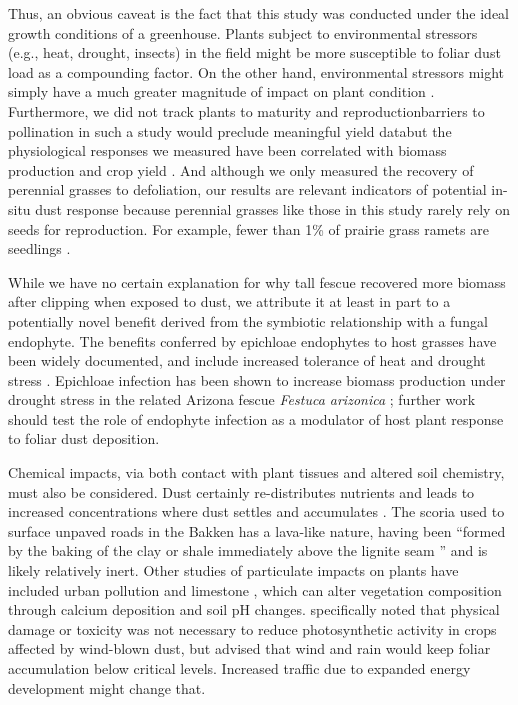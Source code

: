 \documentclass{svjour3}
\begin{document}
Thus, an obvious caveat is the fact that this study was conducted under the ideal growth conditions of a greenhouse. 
Plants subject to environmental stressors (e.g., heat, drought, insects) in the field might be more susceptible to foliar dust load as a compounding factor. 
On the other hand, environmental stressors might simply have a much greater magnitude of impact on plant condition \citep{matsuki2016}. 
Furthermore, we did not track plants to maturity and reproduction\textemdash barriers to pollination in such a study would preclude meaningful yield data\textemdash but the physiological responses we measured have been correlated with biomass production and crop yield \citep[e.g.,][]{fischer1998, zia-khan2014}. 
And although we only measured the recovery of perennial grasses to defoliation, our results are relevant indicators of potential in-situ dust response because perennial grasses like those in this study rarely rely on seeds for reproduction. 
For example, fewer than 1\% of prairie grass ramets are seedlings \citep{benson2006}. 
 
While we have no certain explanation for why tall fescue recovered more biomass after clipping when exposed to dust, we attribute it at least in part to a potentially novel benefit derived from the symbiotic relationship with a fungal endophyte. 
The benefits conferred by epichloae endophytes to host grasses have been widely documented, and include increased tolerance of heat and drought stress \cite{gibert2012,he2013}. 
Epichloae infection has been shown to increase biomass production under drought stress in the related Arizona fescue \emph{Festuca arizonica} \citep{morse2002}; further work should test the role of endophyte infection as a modulator of host plant response to foliar dust deposition. 

Chemical impacts, via both contact with plant tissues and altered soil chemistry, must also be considered. 
Dust certainly re-distributes nutrients and leads to increased concentrations where dust settles and accumulates \citep{brahney2014, lawrence2010}. 
The scoria used to surface unpaved roads in the Bakken has a lava-like nature, having been ``formed by the baking of the clay or shale immediately above the lignite seam \citep[][p.435]{roe1950}'' and is likely relatively inert. 
Other studies of particulate impacts on plants have included urban pollution \citep{bao2015} and limestone \citep{brown2009, organiscak2004}, which can alter vegetation composition through calcium deposition and soil pH changes. 
\citet{armbrust1986} specifically noted that physical damage or toxicity was not necessary to reduce photosynthetic activity in crops affected by wind-blown dust, but advised that wind and rain would keep foliar accumulation below critical levels. 
Increased traffic due to expanded energy development might change that.
\end{document}
